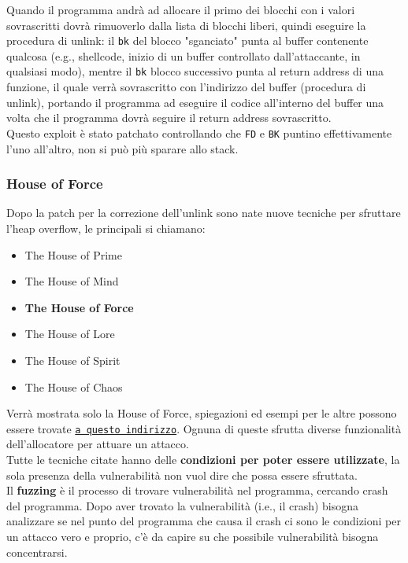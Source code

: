 Quando il programma andrà ad allocare il primo dei blocchi con i valori sovrascritti dovrà rimuoverlo dalla lista di blocchi liberi, quindi eseguire la procedura di unlink: il \texttt{bk} del blocco "sganciato" punta al buffer contenente qualcosa (e.g., shellcode, inizio di un buffer controllato dall'attaccante, in qualsiasi modo), mentre il \texttt{bk} blocco successivo punta al return address di una funzione, il quale verrà sovrascritto con l'indirizzo del buffer (procedura di unlink), portando il programma ad eseguire il codice all'interno del buffer una volta che il programma dovrà seguire il return address sovrascritto.\\

Questo exploit è stato patchato controllando che \texttt{FD} e \texttt{BK} puntino effettivamente l'uno all'altro, non si può più sparare allo stack.\\


\newpage

\subsubsection{House of Force}

Dopo la patch per la correzione dell'unlink sono nate nuove tecniche per sfruttare l'heap overflow, le principali si chiamano:
\begin{itemize}
	\item The House of Prime
	\item The House of Mind
	\item \textbf{The House of Force}
	\item The House of Lore
	\item The House of Spirit
	\item The House of Chaos
\end{itemize}

Verrà mostrata solo la House of Force, spiegazioni ed esempi per le altre possono essere trovate \href{https://github.com/shellphish/how2heap}{\texttt{a questo indirizzo}}. Ognuna di queste sfrutta diverse funzionalità dell'allocatore per attuare un attacco.\\

Tutte le tecniche citate hanno delle \textbf{condizioni per poter essere utilizzate}, la sola presenza della vulnerabilità non vuol dire che possa essere sfruttata.\\

Il \textbf{fuzzing} è il processo di trovare vulnerabilità nel programma, cercando crash del programma. Dopo aver trovato la vulnerabilità (i.e., il crash) bisogna analizzare se nel punto del programma che causa il crash ci sono le condizioni per un attacco vero e proprio, c'è da capire su che possibile vulnerabilità bisogna concentrarsi.\\

